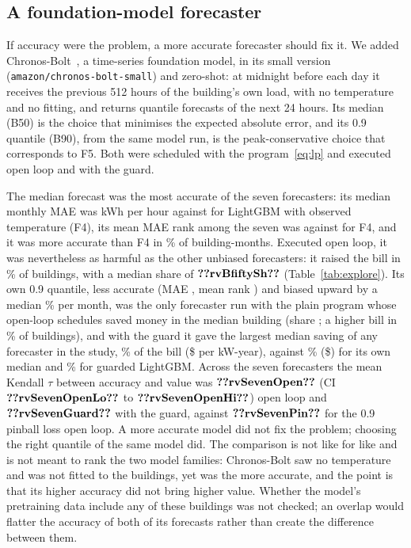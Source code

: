 \subsection{A foundation-model forecaster}\label{sec:explore-tsfm}
If accuracy were the problem, a more accurate forecaster should fix it. We added Chronos-Bolt~\cite{ansari2024chronos}, a time-series foundation model, in its small version (\texttt{amazon/chronos-bolt-small}) and zero-shot: at midnight before each day it receives the previous 512 hours of the building's own load, with no temperature and no fitting, and returns quantile forecasts of the next 24 hours. Its median (B50) is the choice that minimises the expected absolute error, and its 0.9 quantile (B90), from the same model run, is the peak-conservative choice that corresponds to F5. Both were scheduled with the program~\eqref{eq:lp} and executed open loop and with the guard.

The median forecast was the most accurate of the seven forecasters: its median monthly MAE was  kWh per hour against  for LightGBM with observed temperature (F4), its mean MAE rank among the seven was  against  for F4, and it was more accurate than F4 in \% of building-months. Executed open loop, it was nevertheless as harmful as the other unbiased forecasters: it raised the bill in \% of buildings, with a median share of $\res{rvBfiftySh}$ (Table~\ref{tab:explore}). Its own 0.9 quantile, less accurate (MAE , mean rank ) and biased upward by a median \% per month, was the only forecaster run with the plain program whose open-loop schedules saved money in the median building (share ; a higher bill in \% of buildings), and with the guard it gave the largest median saving of any forecaster in the study, \% of the bill (\$ per kW-year), against \% (\$) for its own median and \% for guarded LightGBM. Across the seven forecasters the mean Kendall $\tau$ between accuracy and value was $\res{rvSevenOpen}$ (CI $\res{rvSevenOpenLo}$ to $\res{rvSevenOpenHi}$) open loop and $\res{rvSevenGuard}$ with the guard, against $\res{rvSevenPin}$ for the 0.9 pinball loss open loop. A more accurate model did not fix the problem; choosing the right quantile of the same model did. The comparison is not like for like and is not meant to rank the two model families: Chronos-Bolt saw no temperature and was not fitted to the buildings, yet was the more accurate, and the point is that its higher accuracy did not bring higher value. Whether the model's pretraining data include any of these buildings was not checked; an overlap would flatter the accuracy of both of its forecasts rather than create the difference between them.

